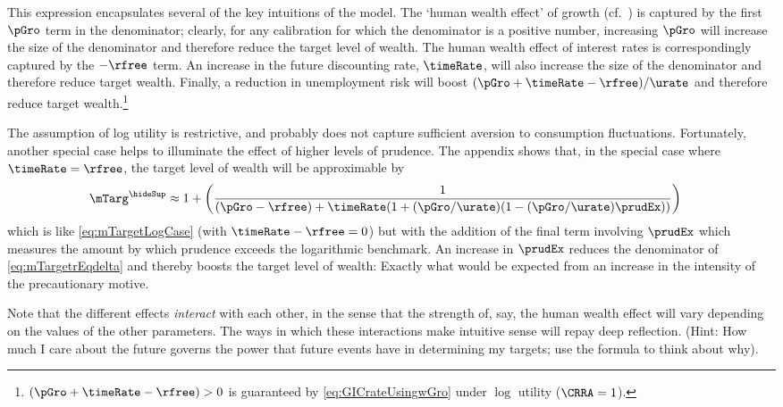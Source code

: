 \documentclass{\handout}
\begin{document}
This expression encapsulates several of the key intuitions of the model.  The
`human wealth effect' of growth (cf.\ \cite{summersCapTax}) is captured by the first $\pGro$ term in the denominator;
clearly, for any calibration for which the denominator is a positive number, increasing
$\pGro$ will increase the size of the denominator and therefore reduce the target
level of wealth.  The human wealth effect of interest rates is  correspondingly captured
by the $-\rfree$ term.  An increase in the future discounting rate, $\timeRate$, will also
increase the size of the denominator and therefore reduce target wealth.  Finally,
a reduction in unemployment risk will boost $(\pGro+\timeRate-\rfree)/\urate$ and therefore reduce target
wealth.\footnote{$(\pGro+\timeRate-\rfree) > 0$ is guaranteed by \eqref{eq:GICrateUsingwGro} under $\log$ utility ($\CRRA=1$).}

The assumption of log utility is restrictive, and probably does not capture sufficient aversion to consumption fluctuations.  Fortunately, another special case helps to illuminate the effect of higher levels of prudence.  The appendix shows that, in the special case where $\timeRate=\rfree$, the target level of wealth will be approximable by
\begin{equation}\begin{gathered}\begin{aligned}
 \mTarg^{\hideSup} & \approx  1 + \left(\frac{1}{(\pGro-\rfree)+\timeRate(1+(\pGro/\urate)(1-(\pGro/\urate)\prudEx))}\right) \label{eq:mTargetrEqdelta}
\end{aligned}\end{gathered}\end{equation}
which is like \eqref{eq:mTargetLogCase} (with $\timeRate-\rfree=0$) but with the addition of the final term involving $\prudEx$ which measures the amount by which prudence exceeds the logarithmic benchmark.  An increase in $\prudEx$ reduces the denominator of \eqref{eq:mTargetrEqdelta} and thereby boosts the target level of wealth: Exactly what would be expected from an increase in the intensity of the precautionary motive.

Note that the different effects {\it interact} with each other, in the sense that the strength of, say, the human wealth effect will vary depending on the values of the other parameters.  The ways in which these interactions make intuitive sense will repay deep reflection.  (Hint: How much I care about the future governs the power that future events have in determining my targets; use the formula to think about why).
\end{document}

